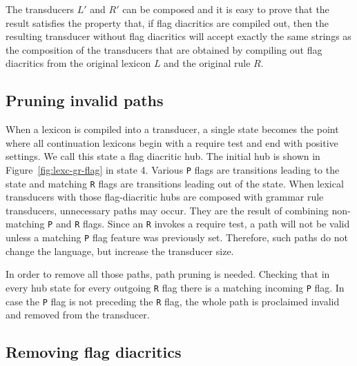 \documentclass[10pt, a4paper]{article}
\begin{document}
The transducers $L'$ and $R'$ can be composed and it is easy to
prove that the result satisfies the property that, if flag diacritics
are compiled out, then the resulting transducer without flag
diacritics will accept exactly the same strings as the composition of
the transducers that are obtained by compiling out flag diacritics
from the original lexicon $L$ and the original rule $R$.



\subsection{Pruning invalid paths}

When a lexicon is compiled into a transducer, a single state becomes the point where all continuation lexicons begin with a require test and end with positive settings. We call this state a flag diacritic hub. The initial hub is shown in
Figure~\ref{fig:lexc-gr-flag} in state 4. Various \verb+P+ flags are transitions leading to the state and matching \verb+R+ flags are transitions leading out of the state. 
When lexical transducers with those flag-diacritic hubs are composed with grammar rule transducers, unnecessary paths may occur. 
They are the result of combining non-matching \verb+P+ and \verb+R+ flags. Since an \verb+R+ invokes a require test, 
a path will not be valid unless a matching \verb+P+ flag feature was previously set. 
Therefore, such paths do not change the language, but increase the transducer size.

In order to remove all those paths, path pruning is needed. Checking that in every hub state for every outgoing 
\verb+R+ flag there is a matching incoming \verb+P+ flag. In case the \verb+P+ flag is not preceding the \verb+R+ flag, 
the whole path is proclaimed invalid and removed from the transducer.





		

\subsection{Removing flag diacritics}
\end{document}
